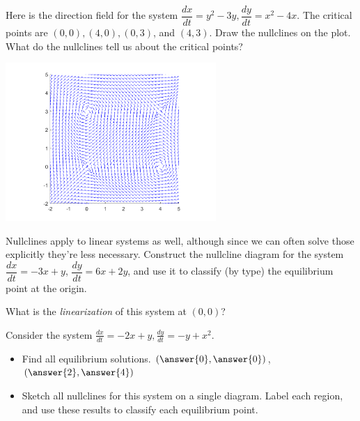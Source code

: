 \documentclass{ximera}
\begin{document}
\begin{exercise}
    Here is the direction field for the system $\dfrac{dx}{dt}=y^2-3y, \dfrac{dy}{dt}=x^2-4x$. The critical points are $(0,0), (4,0), (0,3)$, and $(4,3)$. Draw the nullclines on the plot. What do the nullclines tell us about the critical points?
    
    \begin{center}
        \includegraphics[width=0.6\textwidth]{../figures/NLVF_1.png}
    \end{center}
\end{exercise}
%

\begin{exercise}
    Nullclines apply to linear systems as well, although since we can often solve those explicitly they're less necessary. Construct the nullcline diagram for the system $\dfrac{dx}{dt}=-3x+y$, $\dfrac{dy}{dt}=6x+2y$, and use it to classify (by type) the equilibrium point at the origin. 
    
    
    \begin{feedback}
        What is the {\it linearization} of this system at $(0,0)$?
    \end{feedback}
\end{exercise}

\begin{exercise}
    Consider the system $\displaystyle \frac{dx}{dt}= -2x+y, \frac{dy}{dt}=-y+x^2$.
    \begin{itemize}
        \item Find all equilibrium solutions. $\left(\answer{0}, \answer{0}\right)$, $\left(\answer{2}, \answer{4}\right)$
        \item Sketch all nullclines for this system on a single diagram. Label each region, and use these results to classify each equilibrium point.
    \end{itemize}
\end{exercise}
\end{document}
